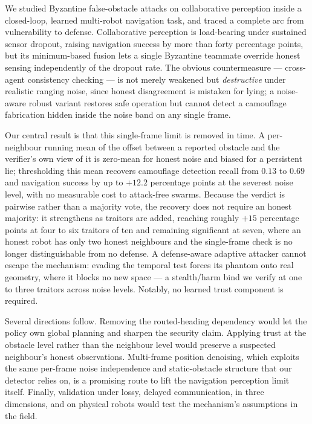 We studied Byzantine false-obstacle attacks on collaborative perception
inside a closed-loop, learned multi-robot navigation task, and traced a
complete arc from vulnerability to defense. Collaborative perception is
load-bearing under sustained sensor dropout, raising navigation success by
more than forty percentage points, but its minimum-based fusion lets a
single Byzantine teammate override honest sensing independently of the
dropout rate. The obvious countermeasure --- cross-agent consistency
checking --- is not merely weakened but \emph{destructive} under realistic
ranging noise, since honest disagreement is mistaken for lying; a
noise-aware robust variant restores safe operation but cannot detect a
camouflage fabrication hidden inside the noise band on any single frame.

Our central result is that this single-frame limit is removed in time. A
per-neighbour running mean of the offset between a reported obstacle and the
verifier's own view of it is zero-mean for honest noise and biased for a
persistent lie; thresholding this mean recovers camouflage detection recall
from $0.13$ to $0.69$ and navigation success by up to $+12.2$ percentage
points at the severest noise level, with no measurable cost to attack-free
swarms. Because the verdict is pairwise rather than a majority vote, the
recovery does not require an honest majority: it strengthens as traitors are
added, reaching roughly $+15$ percentage points at four to six traitors of
ten and remaining significant at seven, where an honest robot has only two
honest neighbours and the single-frame check is no longer distinguishable
from no defense. A
defense-aware adaptive attacker cannot escape the mechanism: evading the
temporal test forces its phantom onto real geometry, where it blocks no new
space --- a stealth/harm bind we verify at one to three traitors across
noise levels. Notably, no learned trust component is required.

Several directions follow. Removing the routed-heading dependency would let
the policy own global planning and sharpen the security claim. Applying
trust at the obstacle level rather than the neighbour level would preserve a
suspected neighbour's honest observations. Multi-frame position denoising,
which exploits the same per-frame noise independence and static-obstacle
structure that our detector relies on, is a promising route to lift the
navigation perception limit itself. Finally, validation under lossy,
delayed communication, in three dimensions, and on physical robots would
test the mechanism's assumptions in the field.
